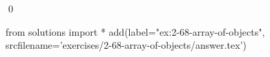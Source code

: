 
\begin{ex}
  \label{ex:2-68-array-of-objects}
  
  \qed
\end{ex}
\begin{python0}
from solutions import *
add(label="ex:2-68-array-of-objects",
    srcfilename='exercises/2-68-array-of-objects/answer.tex')
\end{python0}
